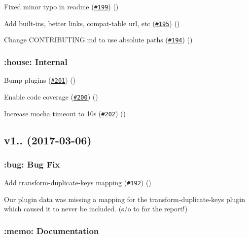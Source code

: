 \begin{DoxyItemize}
\item Fixed minor typo in readme (\href{https://github.com/babel/babel-preset-env/pull/199}{\tt \#199}) ()
\item Add built-\/ins, better links, compat-\/table url, etc (\href{https://github.com/babel/babel-preset-env/pull/195}{\tt \#195}) ()
\item Change C\+O\+N\+T\+R\+I\+B\+U\+T\+I\+N\+G.\+md to use absolute paths (\href{https://github.com/babel/babel-preset-env/pull/194}{\tt \#194}) ()
\end{DoxyItemize}

\subsubsection*{\+:house\+: Internal}


\begin{DoxyItemize}
\item Bump plugins (\href{https://github.com/babel/babel-preset-env/pull/201}{\tt \#201}) ()
\item Enable code coverage (\href{https://github.com/babel/babel-preset-env/pull/200}{\tt \#200}) ()
\item Increase mocha timeout to 10s (\href{https://github.com/babel/babel-preset-env/pull/202}{\tt \#202}) ()
\end{DoxyItemize}

\subsection*{v1.. (2017-\/03-\/06)}

\subsubsection*{\+:bug\+: Bug Fix}


\begin{DoxyItemize}
\item Add transform-\/duplicate-\/keys mapping (\href{https://github.com/babel/babel-preset-env/pull/192}{\tt \#192}) ()
\end{DoxyItemize}

Our plugin data was missing a mapping for the {\ttfamily transform-\/duplicate-\/keys} plugin which caused it to never be included. (s/o to  for the report!)

\subsubsection*{\+:memo\+: Documentation}


